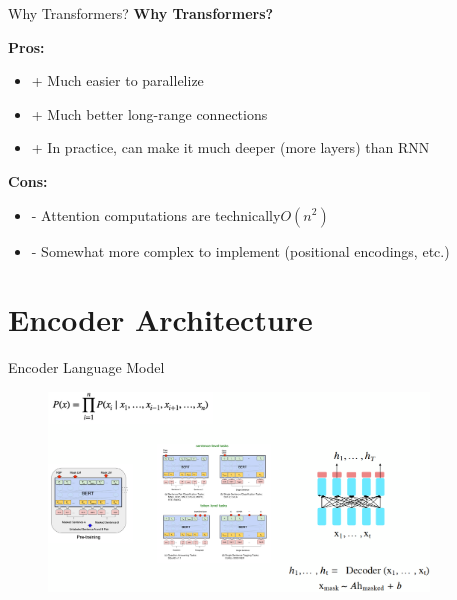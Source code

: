 \documentclass[serif, aspectratio=169]{beamer}
\begin{document}
\begin{frame}{Why Transformers?}
    \Huge
    \textbf{Why Transformers?}
    
    \vspace{0.5cm}
    
    \large
    \textbf{Pros:}
    \begin{itemize}
        \item[] {\color[rgb]{0,0.5,0}+ Much easier to parallelize}
        \item[] {\color[rgb]{0,0.5,0}+ Much better long-range connections}
        \item[] {\color[rgb]{0,0.5,0}+ In practice, can make it much deeper (more layers) than RNN}
    \end{itemize}
    
    \vspace{0.5cm}
    
    \textbf{Cons:}
    \begin{itemize}
        \item[] {\color{red}- Attention computations are technically$O(n^2)$}
        \item[] {\color{red}- Somewhat more complex to implement (positional encodings, etc.)}
    \end{itemize}
\end{frame}

\section{Encoder Architecture}

\begin{frame}{Encoder Language Model}
    \begin{figure}
        \centering
        \includegraphics[width=0.9\textwidth]{Figures/encoderlm.png}
    \end{figure}
\end{frame}
\end{document}

